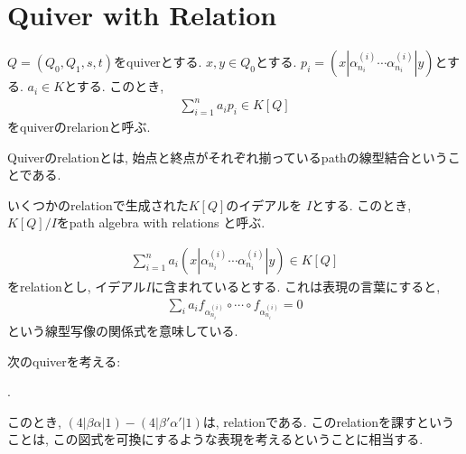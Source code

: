 \section{Quiver with Relation}
\begin{definition}
$Q=(Q_0,Q_1,s,t)$をquiverとする.
  $x,y\in Q_0$とする.
  $p_i=(x|\alpha_{n_i}^{(i)}\cdots \alpha_{n_i}^{(i)}|y)$とする.
  $a_i\in K$とする.
  このとき,
  \begin{align*}
    \sum_{i=1}^{n}a_i p_i \in K[Q]
  \end{align*}
  をquiverのrelarionと呼ぶ.
\end{definition}
\begin{remark}
  Quiverのrelationとは,
  始点と終点がそれぞれ揃っているpathの線型結合ということである.
\end{remark}
\begin{definition}
  いくつかのrelationで生成された$K[Q]$のイデアルを
  $I$とする.
  このとき,
  $K[Q]/I$をpath algebra with relations
  と呼ぶ.
\end{definition}
\begin{remark}
  \begin{align*}
    \sum_{i=1}^{n}a_i (x|\alpha_{n_i}^{(i)}\cdots \alpha_{n_i}^{(i)}|y) \in K[Q]
  \end{align*}
  をrelationとし,
  イデアル$I$に含まれているとする.
  これは表現の言葉にすると,
  \begin{align*}
    \sum_{i}a_i f_{\alpha_{n_i}^{(i)}}\circ\cdots\circ f_{\alpha_{n_i}^{(i)}}=0
  \end{align*}
  という線型写像の関係式を意味している.
\end{remark}
\begin{example}
  次のquiverを考える:
\begin{center}
  .
\end{center}
このとき,
$(4|\beta\alpha|1)-(4|\beta'\alpha'|1)$は,
relationである.
このrelationを課すということは,
この図式を可換にするような表現を考えるということに相当する.
\end{example}




